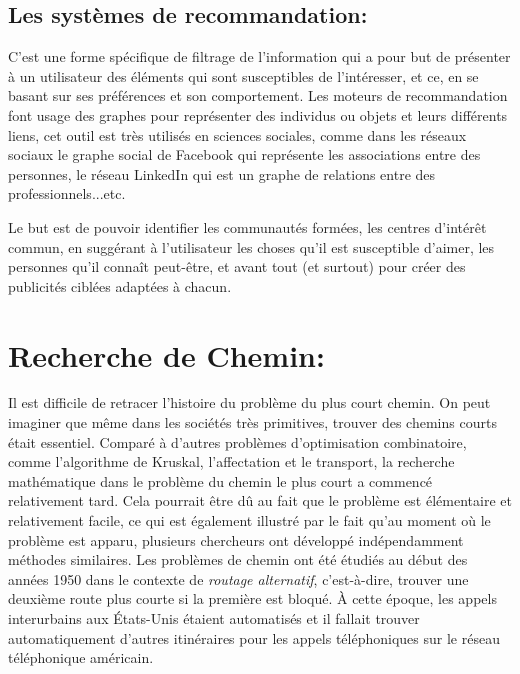 \subsection{Les systèmes de recommandation:}
C'est une forme spécifique de filtrage de l'information qui a pour but de présenter à un utilisateur des éléments qui sont susceptibles de l'intéresser, et ce, en se basant sur ses préférences et son comportement.
Les moteurs de recommandation font usage des graphes pour représenter des individus ou objets et leurs différents liens, cet outil est très utilisés en sciences sociales, comme dans les réseaux sociaux le graphe social de Facebook qui représente les associations entre des personnes, le réseau LinkedIn qui est un graphe de relations entre des professionnels...etc.

Le but est de pouvoir identifier les communautés formées, les centres d'intérêt commun, en suggérant à l'utilisateur les choses qu'il est susceptible d'aimer, les personnes qu'il connaît peut-être, et avant tout (et surtout) pour créer des publicités ciblées adaptées à chacun.


\section{Recherche de Chemin:}
	Il est difficile de retracer l'histoire du problème du plus court chemin. On peut imaginer que même dans les sociétés très primitives, trouver des chemins courts était essentiel. Comparé à d'autres problèmes d'optimisation combinatoire, comme l'algorithme de Kruskal, l'affectation et le transport, la recherche mathématique dans le problème du chemin le plus court a commencé relativement tard. Cela pourrait être dû au fait que le problème est élémentaire et relativement facile, ce qui est également illustré par le fait qu'au moment où le problème est apparu, plusieurs chercheurs ont développé indépendamment méthodes similaires.
Les problèmes de chemin ont été étudiés au début des années 1950 dans le contexte de \emph{routage alternatif}, c'est-à-dire, trouver une deuxième route plus courte si la première est bloqué. À cette époque, les appels interurbains aux États-Unis étaient automatisés et il fallait trouver automatiquement d'autres itinéraires pour les appels téléphoniques sur le réseau téléphonique américain.
	
